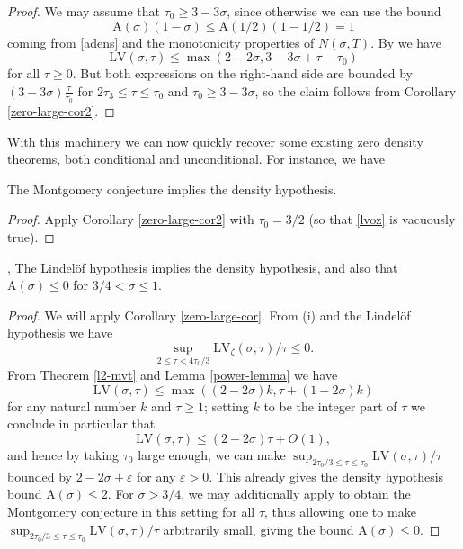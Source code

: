 \documentclass[a4paper, 10pt]{amsart}
\newcommand{\eps}{\varepsilon}
\newcommand{\LV}{\mathrm{LV}}
\newcommand{\A}{\mathrm{A}}
\begin{document}
\begin{proof}  We may assume that $\tau_0 \geq 3-3\sigma$, since otherwise we can use the bound
    $$ \A(\sigma)(1-\sigma) \leq \A(1/2)(1-1/2) = 1$$
coming from \eqref{adens} and the monotonicity properties of $N(\sigma,T)$.  By  we have
$$ \LV(\sigma,\tau) \leq \max( 2-2\sigma, 3-3\sigma + \tau - \tau_0 )$$
for all $\tau \geq 0$.  But both expressions on the right-hand side are bounded by $(3-3\sigma) \frac{\tau}{\tau_0}$ for $2\tau_3 \leq \tau \leq \tau_0$ and $\tau_0 \geq 3-3\sigma$, so the claim follows from Corollary \ref{zero-large-cor2}.
\end{proof}

With this machinery we can now quickly recover some existing zero density theorems, both conditional and unconditional. For instance, we have

\begin{theorem}\label{montgomery_implies_density} The Montgomery conjecture implies the density hypothesis.
\end{theorem}

\begin{proof} Apply Corollary \ref{zero-large-cor2} with $\tau_0=3/2$ (so that \eqref{lvoz} is vacuously true).
\end{proof}

\begin{theorem}\label{lindelof_implies_density} \cite{ingham_estimation_1940}, \cite{halasz_distribution_1969}
    The Lindel\"{o}f hypothesis implies the density hypothesis, and also that $\A(\sigma) \leq 0$ for $3/4 < \sigma \leq 1$.
\end{theorem}

\begin{proof} We will apply Corollary \ref{zero-large-cor}.  From (i) and the Lindel\"{o}f hypothesis we have
$$ \sup_{2 \leq \tau < 4\tau_0/3} \LV_\zeta(\sigma,\tau)/\tau\leq 0.$$
From Theorem \ref{l2-mvt} and Lemma \ref{power-lemma} we have
\begin{equation*}\label{ap}
     \LV(\sigma,\tau) \leq \max( (2-2\sigma)k, \tau + (1 - 2 \sigma)k )
\end{equation*}
for any natural number $k$ and $\tau \geq 1$; setting $k$ to be the integer part of $\tau$ we conclude in particular that
$$ \LV(\sigma,\tau) \leq (2-2\sigma)\tau + O(1),$$
and hence by taking $\tau_0$ large enough, we can make
$\sup_{2\tau_0/3 \leq \tau \leq \tau_0} \LV(\sigma,\tau)/\tau$ bounded by $2-2\sigma + \eps$ for any $\eps>0$.  This already gives the density hypothesis bound $\A(\sigma) \leq 2$.  For $\sigma > 3/4$, we may additionally apply \cite[Theorem 1]{halasz_distribution_1969} to obtain the Montgomery conjecture in this setting for all $\tau$, thus allowing one to make
$\sup_{2\tau_0/3 \leq \tau \leq \tau_0} \LV(\sigma,\tau)/\tau$ arbitrarily small, giving the bound $\A(\sigma) \leq 0$.
\end{proof}
\end{document}
